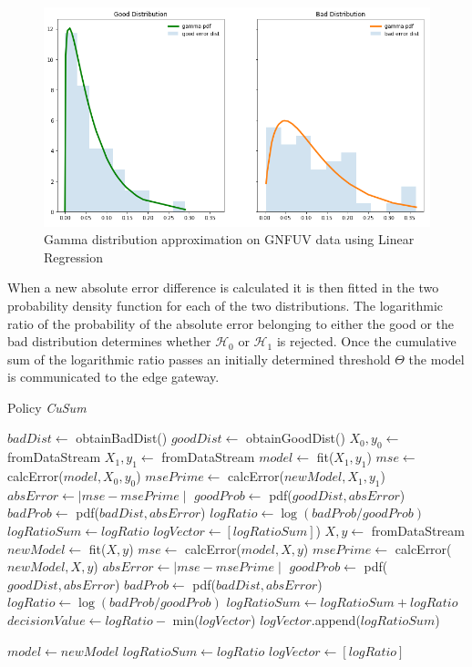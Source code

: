 \documentclass{mpaper}
\begin{document}
\begin{figure}[h]
    \centering
    \includegraphics[scale=0.3]{imgs/goodVSbad.png}
    \caption{Gamma distribution approximation on GNFUV data using Linear Regression}
    \label{fig:goodvsbad}
\end{figure}

When a new absolute error difference is calculated it is then fitted in the two probability density function for each of the two distributions. The logarithmic ratio of the probability of the absolute error belonging to either the good or the bad distribution determines whether $\mathcal{H}_0$ or $\mathcal{H}_1$ is rejected. Once the cumulative sum of the logarithmic ratio passes an initially determined threshold $\Theta$ the model is communicated to the edge gateway.

\begin{algorithm}[!h]
\caption{Policy \textit{CuSum}}\label{polCusum}
\begin{algorithmic}
\State $badDist \gets$ obtainBadDist() 
\State $goodDist \gets$ obtainGoodDist() 
\State $X_0, y_0 \gets$ fromDataStream
\State $X_1, y_1 \gets$ fromDataStream
\State $model \gets$ fit($X_1, y_1$)
\State $mse \gets$ calcError($model,X_0,y_0$)
\State $msePrime \gets$ calcError($newModel,X_1,y_1$)
\State $absError \gets \mid mse - msePrime \mid$
\State $goodProb \gets$ pdf($goodDist,absError$)
\State $badProb \gets$ pdf($badDist,absError$)
\State $logRatio \gets \log(badProb/goodProb)$
\State $logRatioSum \gets logRatio$
\State $logVector \gets [logRatioSum]$)
    \State $X, y \gets$ fromDataStream
    \State $newModel \gets$ fit($X,y$)
    \State $mse \gets$ calcError($model,X,y$)
    \State $msePrime \gets$ calcError($newModel,X,y$)
    \State $absError \gets \mid mse - msePrime \mid$
    \State $goodProb \gets$ pdf($goodDist, absError$)
    \State $badProb \gets$ pdf($badDist, absError$)
    \State $logRatio \gets \log(badProb/goodProb)$
    \State $logRatioSum \gets logRatioSum + logRatio$
    \State $decisionValue \gets logRatio - $ min($logVector$)
    \State $logVector$.append($logRatioSum$)

        \State $model \gets newModel$ 
        \State $logRatioSum \gets logRatio$
        \State $logVector \gets [logRatio]$
    \EndIf
\EndWhile
\end{algorithmic}
\end{algorithm}
\end{document}
